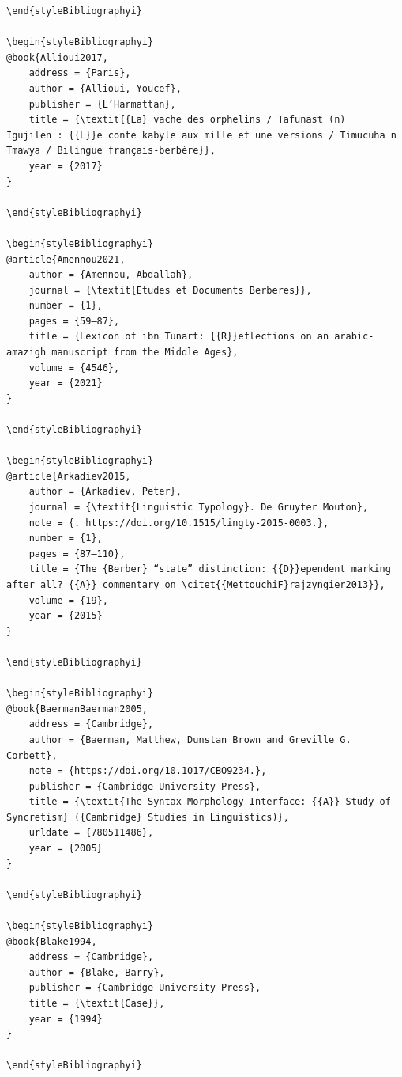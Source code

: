 \documentclass[output=paper]{langscibook}
\begin{document}
\begin{verbatim}
\end{styleBibliographyi}

\begin{styleBibliographyi}
@book{Allioui2017,
	address = {Paris},
	author = {Allioui, Youcef},
	publisher = {L’Harmattan},
	title = {\textit{{La} vache des orphelins / Tafunast (n) Igujilen : {{L}}e conte kabyle aux mille et une versions / Timucuha n Tmawya / Bilingue français-berbère}},
	year = {2017}
}

\end{styleBibliographyi}

\begin{styleBibliographyi}
@article{Amennou2021,
	author = {Amennou, Abdallah},
	journal = {\textit{Etudes et Documents Berberes}},
	number = {1},
	pages = {59–87},
	title = {Lexicon of ibn Tūnart: {{R}}eflections on an arabic-amazigh manuscript from the Middle Ages},
	volume = {4546},
	year = {2021}
}

\end{styleBibliographyi}

\begin{styleBibliographyi}
@article{Arkadiev2015,
	author = {Arkadiev, Peter},
	journal = {\textit{Linguistic Typology}. De Gruyter Mouton},
	note = {. https://doi.org/10.1515/lingty-2015-0003.},
	number = {1},
	pages = {87–110},
	title = {The {Berber} “state” distinction: {{D}}ependent marking after all? {{A}} commentary on \citet{{MettouchiF}rajzyngier2013}},
	volume = {19},
	year = {2015}
}

\end{styleBibliographyi}

\begin{styleBibliographyi}
@book{BaermanBaerman2005,
	address = {Cambridge},
	author = {Baerman, Matthew, Dunstan Brown and Greville G. Corbett},
	note = {https://doi.org/10.1017/CBO9234.},
	publisher = {Cambridge University Press},
	title = {\textit{The Syntax-Morphology Interface: {{A}} Study of Syncretism} ({Cambridge} Studies in Linguistics)},
	urldate = {780511486},
	year = {2005}
}

\end{styleBibliographyi}

\begin{styleBibliographyi}
@book{Blake1994,
	address = {Cambridge},
	author = {Blake, Barry},
	publisher = {Cambridge University Press},
	title = {\textit{Case}},
	year = {1994}
}

\end{styleBibliographyi}


\end{verbatim}
\end{document}
